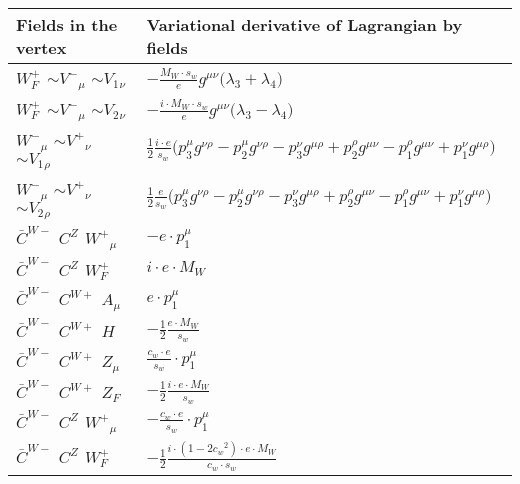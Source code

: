 \begin{center}
\begin{tabular}{|l|l|} \hline
Fields in the vertex & Variational derivative of Lagrangian by fields \\ \hline
$W^+_F{}_{}$ \phantom{-} $\sim V^-{}_{\mu }$ \phantom{-} $\sim V_1{}_{\nu }$ \phantom{-}  &
	$-\frac{ M_W \cdot s_w}{ e}g^{\mu \nu} \big( \lambda_3+ \lambda_4\big)$\\[2mm]
$W^+_F{}_{}$ \phantom{-} $\sim V^-{}_{\mu }$ \phantom{-} $\sim V_2{}_{\nu }$ \phantom{-}  &
	$-\frac{ i \cdot M_W \cdot s_w}{ e}g^{\mu \nu} \big( \lambda_3- \lambda_4\big)$\\[2mm]
$W^-{}_{\mu }$ \phantom{-} $\sim V^+{}_{\nu }$ \phantom{-} $\sim V_1{}_{\rho }$ \phantom{-}  &
	$\frac{1}{2}\frac{ i \cdot e}{ s_w}\big(p_3^\mu g^{\nu \rho} -p_2^\mu g^{\nu \rho} -p_3^\nu g^{\mu \rho} +p_2^\rho g^{\mu \nu} -p_1^\rho g^{\mu \nu} +p_1^\nu g^{\mu \rho} \big)$\\[2mm]
$W^-{}_{\mu }$ \phantom{-} $\sim V^+{}_{\nu }$ \phantom{-} $\sim V_2{}_{\rho }$ \phantom{-}  &
	$\frac{1}{2}\frac{ e}{ s_w}\big(p_3^\mu g^{\nu \rho} -p_2^\mu g^{\nu \rho} -p_3^\nu g^{\mu \rho} +p_2^\rho g^{\mu \nu} -p_1^\rho g^{\mu \nu} +p_1^\nu g^{\mu \rho} \big)$\\[2mm]
$\bar{C}^{W-}{}_{}$ \phantom{-} $C^{Z}{}_{}$ \phantom{-} $W^+{}_{\mu }$ \phantom{-}  &
	$- e\cdot p_1^\mu $\\[2mm]
$\bar{C}^{W-}{}_{}$ \phantom{-} $C^{Z}{}_{}$ \phantom{-} $W^+_F{}_{}$ \phantom{-}  &
	$ i \cdot e \cdot M_W$\\[2mm]
$\bar{C}^{W-}{}_{}$ \phantom{-} $C^{W+}{}_{}$ \phantom{-} ${A}_{\mu }$ \phantom{-}  &
	$ e\cdot p_1^\mu $\\[2mm]
$\bar{C}^{W-}{}_{}$ \phantom{-} $C^{W+}{}_{}$ \phantom{-} ${H}_{}$ \phantom{-}  &
	$-\frac{1}{2}\frac{ e \cdot M_W}{ s_w}$\\[2mm]
$\bar{C}^{W-}{}_{}$ \phantom{-} $C^{W+}{}_{}$ \phantom{-} ${Z}_{\mu }$ \phantom{-}  &
	$\frac{ c_w \cdot e}{ s_w}\cdot p_1^\mu $\\[2mm]
$\bar{C}^{W-}{}_{}$ \phantom{-} $C^{W+}{}_{}$ \phantom{-} $Z_F{}_{}$ \phantom{-}  &
	$-\frac{1}{2}\frac{ i \cdot e \cdot M_W}{ s_w}$\\[2mm]
$\bar{C}^{W-}{}_{}$ \phantom{-} $C^{Z}{}_{}$ \phantom{-} $W^+{}_{\mu }$ \phantom{-}  &
	$-\frac{ c_w \cdot e}{ s_w}\cdot p_1^\mu $\\[2mm]
$\bar{C}^{W-}{}_{}$ \phantom{-} $C^{Z}{}_{}$ \phantom{-} $W^+_F{}_{}$ \phantom{-}  &
	$-\frac{1}{2}\frac{ i \cdot (1-2 c_w {}^2) \cdot e \cdot M_W}{ c_w \cdot s_w}$\\[2mm]

\end{tabular}
\end{center}
